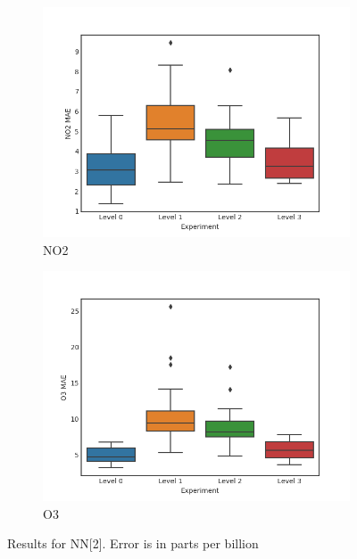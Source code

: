 \documentclass{article}
\begin{document}
\begin{figure}[H]
\centering
\begin{subfigure}{0.45\textwidth}
\includegraphics[width=\textwidth]{results/nn-2/no2.png}
\caption{NO2}
\end{subfigure}
\begin{subfigure}{0.45\textwidth}
\includegraphics[width=\textwidth]{results/nn-2/o3.png}
\caption{O3}
\end{subfigure}
\caption{Results for NN[2]. Error is in parts per billion}
\label{fig:results-nn2}
\end{figure}
\end{document}
